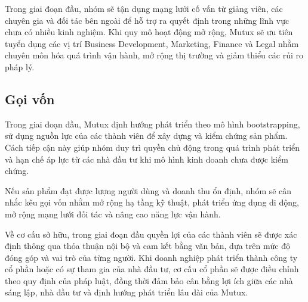 Trong giai đoạn đầu, nhóm sẽ tận dụng mạng lưới cố vấn từ giảng viên, các chuyên gia và đối tác bên ngoài để hỗ trợ ra quyết định trong những lĩnh vực chưa có nhiều kinh nghiệm. Khi quy mô hoạt động mở rộng, Mutux sẽ ưu tiên tuyển dụng các vị trí Business Development, Marketing, Finance và Legal nhằm chuyên môn hóa quá trình vận hành, mở rộng thị trường và giảm thiểu các rủi ro pháp lý.

\subsection{Gọi vốn}
Trong giai đoạn đầu, Mutux định hướng phát triển theo mô hình bootstrapping, sử dụng nguồn lực của các thành viên để xây dựng và kiểm chứng sản phẩm. Cách tiếp cận này giúp nhóm duy trì quyền chủ động trong quá trình phát triển và hạn chế áp lực từ các nhà đầu tư khi mô hình kinh doanh chưa được kiểm chứng.

Nếu sản phẩm đạt được lượng người dùng và doanh thu ổn định, nhóm sẽ cân nhắc kêu gọi vốn nhằm mở rộng hạ tầng kỹ thuật, phát triển ứng dụng di động, mở rộng mạng lưới đối tác và nâng cao năng lực vận hành.

Về cơ cấu sở hữu, trong giai đoạn đầu quyền lợi của các thành viên sẽ được xác định thông qua thỏa thuận nội bộ và cam kết bằng văn bản, dựa trên mức độ đóng góp và vai trò của từng người. Khi doanh nghiệp phát triển thành công ty cổ phần hoặc có sự tham gia của nhà đầu tư, cơ cấu cổ phần sẽ được điều chỉnh theo quy định của pháp luật, đồng thời đảm bảo cân bằng lợi ích giữa các nhà sáng lập, nhà đầu tư và định hướng phát triển lâu dài của Mutux.